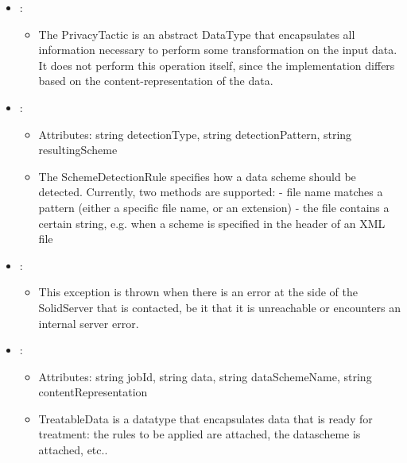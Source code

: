 \begin{itemize}[nolistsep,noitemsep]
\item {}: 
\begin{itemize}[noitemsep,nolistsep]

\item[] The PrivacyTactic is an abstract DataType that encapsulates all information necessary to perform some transformation on the input data. It does not perform this operation itself, since the implementation differs based on the content-representation of the data.
\end{itemize}

\item {}: 
\begin{itemize}[noitemsep,nolistsep]
\item[] Attributes: string detectionType, string detectionPattern, string resultingScheme
\item[] The SchemeDetectionRule specifies how a data scheme should be detected. Currently, two methods are supported:
- file name matches a pattern (either a specific file name, or an extension)
- the file contains a certain string, e.g. when a scheme is specified in the header of an XML file
\end{itemize}

\item {}: 
\begin{itemize}[noitemsep,nolistsep]

\item[] This exception is thrown when there is an error at the side of the SolidServer that is contacted, be it that it is unreachable or encounters an internal server error.
\end{itemize}

\item {}: 
\begin{itemize}[noitemsep,nolistsep]
\item[] Attributes: string jobId, string data, string dataSchemeName, string contentRepresentation
\item[] TreatableData is a datatype that encapsulates data that is ready for treatment: the rules to be applied are attached, the datascheme is attached, etc..
\end{itemize}

\end{itemize}

%